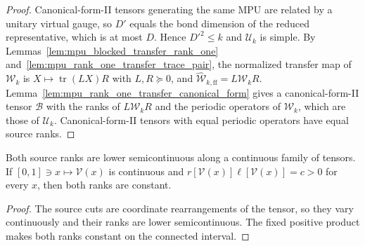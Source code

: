 \begin{proof}\leanok
    Canonical-form-II tensors generating the same MPU are related by a unitary
    virtual gauge, so $D'$ equals the bond dimension of the reduced
    representative, which is at most $D$. Hence $D'^2\leq k$ and
    $\mathcal U_k$ is simple. By Lemmas~\ref{lem:mpu_blocked_transfer_rank_one}
    and~\ref{lem:mpu_rank_one_transfer_trace_pair}, the normalized transfer map
    of $\mathcal W_k$ is $X\mapsto\operatorname{tr}(LX)R$ with $L,R\succeq0$,
    and $\widehat{\mathcal W}_{k,\mathrm{ff}}=L\mathcal W_kR$.
    Lemma~\ref{lem:mpu_rank_one_transfer_canonical_form} gives a
    canonical-form-II tensor $\mathcal B$ with the ranks of $L\mathcal W_kR$
    and the periodic operators of $\mathcal W_k$, which are those of
    $\mathcal U_k$. Canonical-form-II tensors with equal periodic operators
    have equal source ranks.
\end{proof}

\begin{lemma}
    \label{lem:mpu_path_fixed_product_source_ranks}
    \leanok
    Both source ranks are lower semicontinuous along a continuous family of
    tensors. If $[0,1]\ni x\mapsto\mathcal V(x)$ is continuous and
    $r[\mathcal V(x)]\ell[\mathcal V(x)]=c>0$ for every $x$, then both ranks
    are constant.
\end{lemma}

\begin{proof}\leanok
    The source cuts are coordinate rearrangements of the tensor, so they vary
    continuously and their ranks are lower semicontinuous. The fixed positive
    product makes both ranks constant on the connected interval.
\end{proof}

